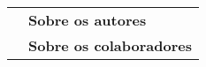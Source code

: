 \begin{table}[ht]
\begin{tabular}{rl}
\medskip
{\textlt[\pageref{part16}]} & \textbf{Sobre os autores}          \\
\medskip
{\textlt[\pageref{part17}]} & \textbf{Sobre os colaboradores}                                                                                                                               
\end{tabular}
\end{table}

\vspace*{\fill}


\pagebreak
\thispagestyle{empty}